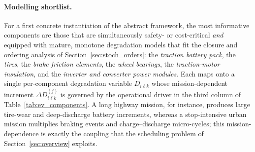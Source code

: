 \documentclass[11pt,a4paper]{article}
\theoremstyle{plain}
\theoremstyle{definition}
\theoremstyle{remark}
\begin{document}
\paragraph{Modelling shortlist.}
For a first concrete instantiation of the abstract framework, the most informative components are those that are simultaneously safety- or cost-critical \emph{and} equipped with mature, monotone degradation models that fit the closure and ordering analysis of Section~\ref{sec:stoch_orders}: the \emph{traction battery pack}, the \emph{tires}, the \emph{brake friction elements}, the \emph{wheel bearings}, the \emph{traction-motor insulation}, and the \emph{inverter and converter power modules}.
Each maps onto a single per-component degradation variable $D_{i\ell k}$ whose mission-dependent increment $\Delta D^{(j)}_{i\ell k}$ is governed by the operational driver in the third column of Table~\ref{tab:ev_components}.
A long highway mission, for instance, produces large tire-wear and deep-discharge battery increments, whereas a stop-intensive urban mission multiplies braking events and charge--discharge micro-cycles; this mission-dependence is exactly the coupling that the scheduling problem of Section~\ref{sec:overview} exploits.
\end{document}
